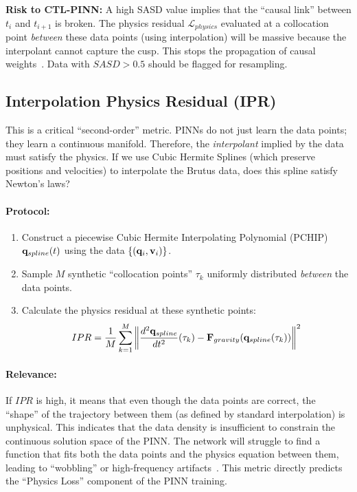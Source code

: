 \textbf{Risk to CTL-PINN:} A high SASD value implies that the ``causal link'' between $t_i$ and $t_{i+1}$ is broken. The physics residual $\mathcal{L}_{physics}$ evaluated at a collocation point \textit{between} these data points (using interpolation) will be massive because the interpolant cannot capture the cusp. This stops the propagation of causal weights~\cite{ref10}. Data with $SASD > 0.5$ should be flagged for resampling.

\subsection{Interpolation Physics Residual (IPR)}

This is a critical ``second-order'' metric. PINNs do not just learn the data points; they learn a continuous manifold. Therefore, the \textit{interpolant} implied by the data must satisfy the physics. If we use Cubic Hermite Splines (which preserve positions and velocities) to interpolate the Brutus data, does this spline satisfy Newton's laws?~\cite{ref16}

\paragraph{Protocol:}
\begin{enumerate}
    \item Construct a piecewise Cubic Hermite Interpolating Polynomial (PCHIP) $\mathbf{q}_{spline}(t)$ using the data $\{(\mathbf{q}_i, \mathbf{v}_i)\}$.
    \item Sample $M$ synthetic ``collocation points'' $\tau_k$ uniformly distributed \textit{between} the data points.
    \item Calculate the physics residual at these synthetic points:
    \begin{equation}
        IPR = \frac{1}{M} \sum_{k=1}^{M} \left\| \frac{d^2 \mathbf{q}_{spline}}{dt^2}(\tau_k) - \mathbf{F}_{gravity}(\mathbf{q}_{spline}(\tau_k)) \right\|^2
    \end{equation}
\end{enumerate}

\paragraph{Relevance:}
If $IPR$ is high, it means that even though the data points are correct, the ``shape'' of the trajectory between them (as defined by standard interpolation) is unphysical. This indicates that the data density is insufficient to constrain the continuous solution space of the PINN. The network will struggle to find a function that fits both the data points and the physics equation between them, leading to ``wobbling'' or high-frequency artifacts~\cite{ref16}. This metric directly predicts the ``Physics Loss'' component of the PINN training.

